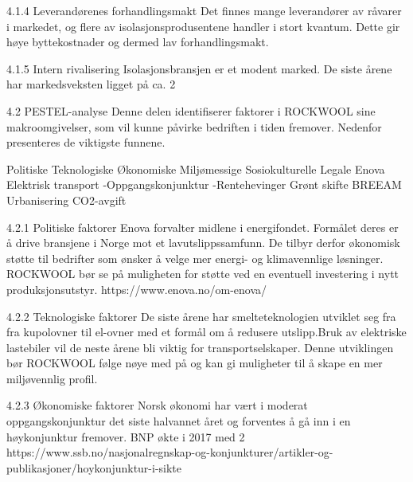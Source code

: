 4.1.4 Leverandørenes forhandlingsmakt
Det finnes mange leverandører av råvarer i markedet, og flere av isolasjonsprodusentene handler i stort kvantum. Dette gir høye byttekostnader og dermed lav forhandlingsmakt.

4.1.5 Intern rivalisering
Isolasjonsbransjen er et modent marked. De siste årene har markedsveksten ligget på ca. 2%

4.2 PESTEL-analyse
Denne delen identifiserer faktorer i ROCKWOOL sine makroomgivelser, som vil kunne påvirke bedriften i tiden fremover. Nedenfor presenteres de viktigste funnene. 

Politiske
Teknologiske
Økonomiske
Miljømessige
Sosiokulturelle
Legale
Enova
Elektrisk transport
-Oppgangskonjunktur
-Rentehevinger
Grønt skifte
BREEAM
Urbanisering
CO2-avgift

4.2.1 Politiske faktorer 
Enova forvalter midlene i energifondet. Formålet deres er å drive bransjene i Norge mot et lavutslippssamfunn. De tilbyr derfor økonomisk støtte til bedrifter som ønsker å velge mer energi- og klimavennlige løsninger. ROCKWOOL bør se på muligheten for støtte ved en eventuell investering i nytt produksjonsutstyr.
https://www.enova.no/om-enova/

4.2.2 Teknologiske faktorer
De siste årene har smelteteknologien utviklet seg fra fra kupolovner til el-ovner med et formål om å redusere utslipp.Bruk av elektriske lastebiler vil de neste årene bli viktig for transportselskaper. Denne utviklingen bør ROCKWOOL følge nøye med på og kan gi muligheter til å skape en mer  miljøvennlig profil.  

4.2.3 Økonomiske faktorer 
Norsk økonomi har vært i moderat oppgangskonjunktur det siste halvannet året og forventes å gå inn i en høykonjunktur fremover. BNP økte i 2017 med 2%
https://www.ssb.no/nasjonalregnskap-og-konjunkturer/artikler-og-publikasjoner/hoykonjunktur-i-sikte

